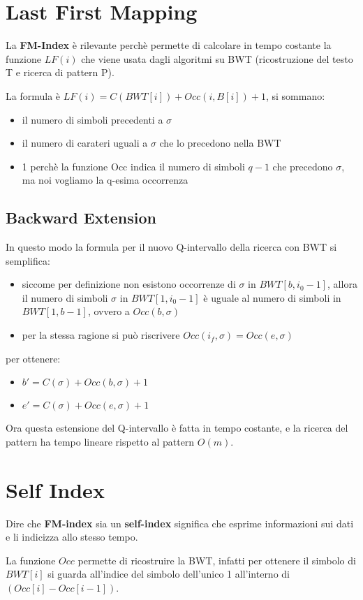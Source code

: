 \section{Last First Mapping}

La \textbf{FM-Index} \`e rilevante perch\`e permette di calcolare in tempo costante la funzione $LF(i)$ che viene usata dagli algoritmi su BWT (ricostruzione del testo T e ricerca di pattern P).

La formula \`e $LF(i) = C(BWT[i]) + Occ(i, B[i]) + 1$, si sommano:

\begin{itemize}
    \item il numero di simboli precedenti a $\sigma$
    \item il numero di carateri uguali a $\sigma$ che lo precedono nella BWT
    \item 1 perch\`e la funzione Occ indica il numero di simboli $q-1$ che precedono $\sigma$, ma noi vogliamo la q-esima occorrenza 
\end{itemize}

\subsection{Backward Extension}

In questo modo la formula per il nuovo Q-intervallo della ricerca con BWT si semplifica:

\begin{itemize}
    \item siccome per definizione non esistono occorrenze di $\sigma$ in $BWT[b, i_0-1]$, allora il numero di simboli $\sigma$ in $BWT[1,i_0-1]$ \`e uguale al numero di simboli in $BWT[1,b-1]$, ovvero a $Occ(b, \sigma)$
    \item per la stessa ragione si pu\`o riscrivere $Occ(i_f, \sigma) = Occ(e, \sigma)$
\end{itemize}

per ottenere:

\begin{itemize}
    \item $b' = C(\sigma) + Occ(b, \sigma) + 1$
    \item $e' = C(\sigma) + Occ(e, \sigma) + 1$
\end{itemize}

Ora questa estensione del Q-intervallo \`e fatta in tempo costante, e la ricerca del pattern ha tempo lineare rispetto al pattern $O(m)$.

\section{Self Index}

Dire che \textbf{FM-index} sia un \textbf{self-index} significa che esprime informazioni sui dati e li indicizza allo stesso tempo.

La funzione $Occ$ permette di ricostruire la BWT, infatti per ottenere il simbolo di $BWT[i]$ si guarda all'indice del simbolo dell'unico 1 all'interno di $(Occ[i] - Occ[i-1])$.
